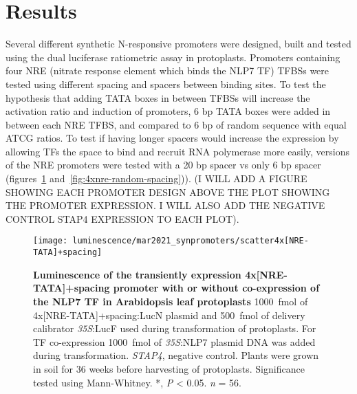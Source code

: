 \documentclass[../main.tex]{subfiles}
\begin{document}
\section{Results}\label{chapter5:results}

Several different synthetic N\hyp{}responsive promoters were designed, built and tested using the dual luciferase ratiometric assay in protoplasts.
Promoters containing four NRE (nitrate response element which binds the NLP7 TF) TFBSs were tested using different spacing and spacers between binding sites.
To test the hypothesis that adding TATA boxes in between TFBSs will increase the activation ratio and induction of promoters, 6 bp TATA boxes were added in between each NRE TFBS, and compared to 6 bp of random sequence with equal ATCG ratios.
To test if having longer spacers would  increase the expression by allowing TFs the space to bind and recruit RNA polymerase more easily, versions of the NRE promoters were tested with a 20 bp spacer vs only 6 bp spacer (figures~\ref{fig:4xnre-tata-spacing} and~\ref{fig:4xnre-random-spacing})).
(I WILL ADD A FIGURE SHOWING EACH PROMOTER DESIGN ABOVE THE PLOT SHOWING THE PROMOTER EXPRESSION. I WILL ALSO ADD THE NEGATIVE CONTROL STAP4 EXPRESSION TO EACH PLOT).
\begin{figure}[hbt!]
	\begin{center}
		\capstart
		\texttt{[image: luminescence/mar2021\_synpromoters/scatter4x[NRE-TATA]+spacing]}
		\caption{
			\textbf{Luminescence of the transiently expression 4x[NRE-TATA]+spacing promoter with or without co\hyp{}expression of the NLP7 TF in Arabidopsis leaf protoplasts}
			\SI{1000}{\fmol} of 4x[NRE-TATA]+spacing:LucN plasmid and \SI{500}{\fmol} of delivery calibrator \textit{35S}:LucF used during transformation of protoplasts.
			For TF co\hyp{}expression \SI{1000}{\fmol} of \textit{35S}:NLP7 plasmid DNA was added during transformation.
			\textit{STAP4}, negative control.
			Plants were grown in soil for 3\textendash{}6 weeks before harvesting of protoplasts.
			Significance tested using Mann-Whitney.
			*, \textit{P} \textless{} 0.05.
			\textit{n} = 5\textendash{}6.
			\label{fig:4xnre-tata-spacing}
		}
	\end{center}
\end{figure}
\end{document}
